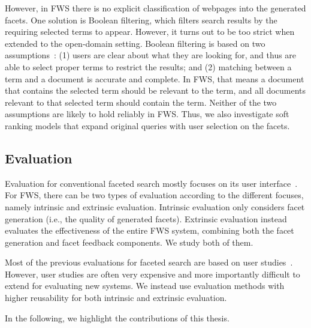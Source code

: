 However, in FWS there is no explicit classification of webpages into the generated facets. One solution is Boolean filtering, which filters search results by the requiring selected terms to appear. However, it turns out to be too strict when extended to the open-domain setting. Boolean filtering is based on two assumptions~\cite{zhang2010interactive}: (1) users are clear about what they are looking for, and thus are able to select proper terms to restrict the results; and (2) matching between a term and a document is accurate and complete. In FWS, that means a document that contains the selected term should be relevant to the term, and all documents relevant to that selected term should contain the term. Neither of the two assumptions are likely to hold reliably in FWS. Thus, we also investigate soft ranking models that expand original queries with user selection on the facets.
  

\subsection{Evaluation}
Evaluation for conventional faceted search mostly focuses on its user interface~\cite{burke1996knowledge,english2002hierarchical,hearst2006design,hearst2008uis,kules2009exploratory}. For FWS, there can be two types of evaluation according to the different focuses, namely intrinsic and extrinsic evaluation. Intrinsic evaluation only considers facet generation (i.e., the quality of generated facets).  Extrinsic evaluation instead evaluates the effectiveness of the entire FWS system, combining both the facet generation and facet feedback components. We study both of them.

Most of the previous evaluations for faceted search are based on user studies~\cite{dash2008dynamic,li2010facetedpedia,stoica2007automating}. However, user studies are often very expensive and more importantly difficult to extend for evaluating new systems. We instead use evaluation methods with higher reusability for both intrinsic and extrinsic evaluation.

In the following, we highlight the contributions of this thesis.
